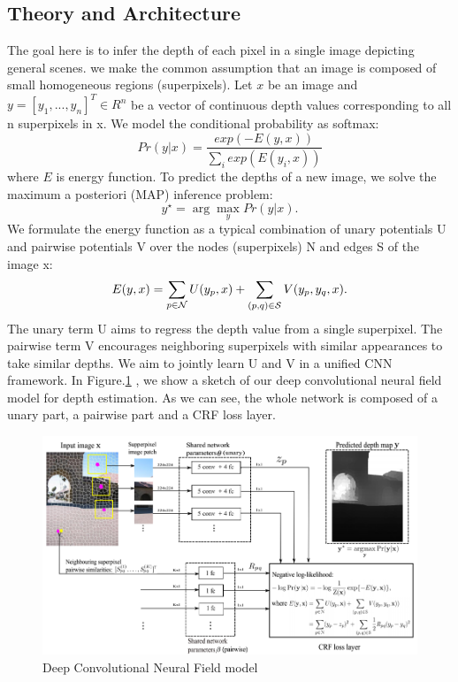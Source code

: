 \documentclass[10pt,twocolumn,letterpaper]{article}
\begin{document}
\subsection{Theory and Architecture}
The goal here is to infer the depth of each pixel in a single image depicting 
general scenes. we make the common assumption that an image is composed of small 
homogeneous regions (superpixels). 
Let $x$ be an image and $y=[y_1,...,y_n]^T\in R^n$ be a vector of continuous 
depth values corresponding to all n superpixels in x. We model the conditional 
probability as softmax:
\begin{equation}
Pr(y|x)=\frac{exp(-E(y,x))}{\sum_i 
exp(E(y_i,x))}
\end{equation}
where $E$ is energy function.
To predict the depths of a new image, we solve the maximum a posteriori (MAP) 
inference problem: 
\begin{equation}
 \label{eq:inference}
y^{\star}=\arg\max\limits_y Pr(y|x). 
\end{equation}
We formulate the energy function as a 
typical combination of unary potentials U and pairwise potentials V over the 
nodes (superpixels) N and edges S of the image x:
\begin{equation}\label{eq:energy}
E(y, x) = \sum_{p \in {\cal N} } U(y_{p}, x) 
	 + \sum_{(p,q) \in {\cal S}} V(y_{p}, y_{q}, x).
\end{equation}
The unary term U aims to regress the depth value from a single superpixel. The 
pairwise term V encourages neighboring superpixels with similar appearances 
to take similar depths. We aim to jointly learn U and V in a unified CNN 
framework.
In Figure.\ref{fig:arch} , we show a sketch of our deep convolutional
neural field model for depth estimation. As we can see, the whole network is 
composed of a unary part, a pairwise part and a CRF loss layer.
\begin{figure}
\includegraphics[width=.9\linewidth]{arch.png}
\caption{Deep Convolutional Neural Field model}
\label{fig:arch}
\end{figure}
\end{document}
